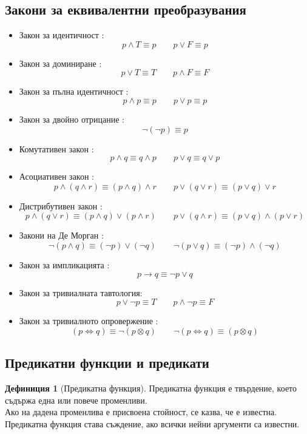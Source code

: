 \documentclass[fleqn, 12pt]{article}
\theoremstyle{definition}
\newtheorem{definition}{Дефиниция}[subsection]
\begin{document}
\newpage

\subsection{Закони за еквивалентни преобразувания}

\begin{itemize}
	\item Закон за идентичност : $$p \land T \equiv p \qquad p \lor F \equiv p$$
	\item Закон за доминиране : $$p \lor T \equiv T \qquad p \land F \equiv F$$
	\item Закон за пълна идентичност : $$p \land p \equiv p \qquad p \lor p \equiv p$$
	\item Закон за двойно отрицание : $$\neg(\neg p) \equiv p $$
	\item Комутативен закон : $$p \land q \equiv q \land p \qquad p \lor q \equiv q \lor p$$
	\item Асоциативен закон : $$p \land (q \land r) \equiv (p \land q ) \land r \qquad p \lor (q \lor r) \equiv (p \lor q ) \lor r$$
	\item Дистрибутивен закон : $$p \land (q \lor r) \equiv (p \land q ) \lor (p \land r ) \qquad p \lor (q \land r) \equiv (p \lor q ) \land (p \lor r )  $$
	\item Закони на Де Морган : $$\neg (p \land q) \equiv (\neg p) \lor (\neg q) \qquad \neg (p \lor q) \equiv (\neg p) \land (\neg q) $$
	\item Закон за импликацията : $$p \to q \equiv \neg p \lor q$$
	\item Закон за тривиалната тавтология:  $$p \lor \neg p \equiv T \qquad p \land \neg p \equiv F$$
	\item Закон за тривиалното опровержение : $$(p \Leftrightarrow q) \equiv \neg (p \otimes q) \qquad \neg (p \Leftrightarrow q) \equiv (p \otimes q) $$
\end{itemize}

\subsection{Предикатни функции и предикати}

\begin{definition}[Предикатна функция]
Предикатна функция е твърдение, което съдържа една или повече променливи. \\
Ако на дадена променлива е присвоена стойност, се казва, че е известна.\\
Предикатна функция става съждение, ако всички нейни аргументи са известни. \\
\end{definition}
\end{document}
